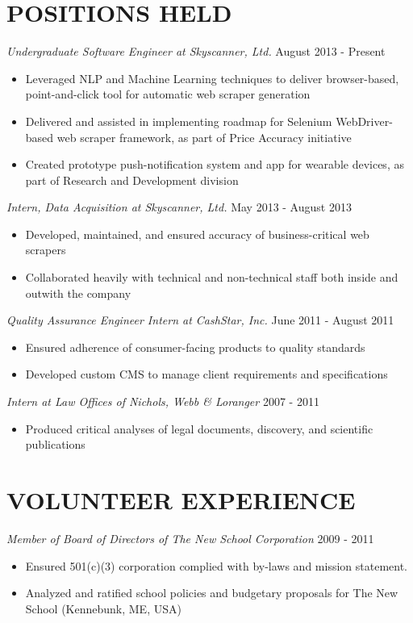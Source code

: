 \documentclass[line, margin]{res}
\begin{document}
\begin{resume}
\section{POSITIONS HELD}
\textit{Undergraduate Software Engineer at Skyscanner, Ltd.} \hfill August 2013 - Present 
\begin{itemize}[leftmargin=10pt]
\item Leveraged NLP and Machine Learning techniques to deliver browser-based, point-and-click tool for automatic web scraper generation
\item Delivered and assisted in implementing roadmap for Selenium WebDriver-based web scraper framework, as part of Price Accuracy initiative
\item Created prototype push-notification system and app for wearable devices, as part of Research and Development division
\end{itemize}
\textit{Intern, Data Acquisition at Skyscanner, Ltd.} \hfill May 2013 - August 2013
\begin{itemize}[leftmargin=10pt]
\item Developed, maintained, and ensured accuracy of business-critical web scrapers
\item Collaborated heavily with technical and non-technical staff both inside and outwith the company
\end{itemize}
\textit{Quality Assurance Engineer Intern at CashStar, Inc.} \hfill June 2011 - August 2011
\begin{itemize}[leftmargin=10pt]
\item Ensured adherence of consumer-facing products to quality standards
\item Developed custom CMS to manage client requirements and specifications
\end{itemize}
\textit{Intern at Law Offices of Nichols, Webb \& Loranger} \hfill 2007 - 2011
\begin{itemize}[leftmargin=10pt]
\item Produced critical analyses of legal documents, discovery, and scientific publications
\end{itemize}

\section{VOLUNTEER EXPERIENCE}
\textit{Member of Board of Directors of The New School Corporation} \hfill 2009 - 2011
\begin{itemize}[leftmargin=10pt]
\item Ensured 501(c)(3) corporation complied with by-laws and mission statement.
\item Analyzed and ratified school policies and budgetary proposals for The New School (Kennebunk, ME, USA)
\end{itemize}


\end{resume}
\end{document}
